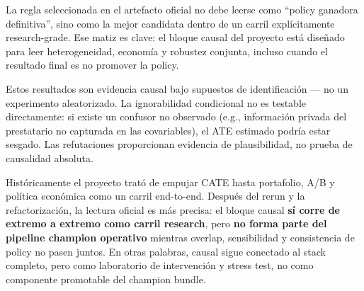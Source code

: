 \documentclass[
  spanish,
  11pt,
  letterpaper,
]{scrbook}
\theoremstyle{plain}
\theoremstyle{remark}
\begin{document}
La regla seleccionada en el artefacto oficial no debe leerse como
``policy ganadora definitiva'', sino como la mejor candidata dentro de
un carril explícitamente research-grade. Ese matiz es clave: el bloque
causal del proyecto está diseñado para leer heterogeneidad, economía y
robustez conjunta, incluso cuando el resultado final es no promover la
policy.

\begin{tcolorbox}[enhanced jigsaw, arc=.35mm, bottomrule=.15mm, bottomtitle=1mm, breakable, colback=white, colbacktitle=quarto-callout-warning-color!10!white, colframe=quarto-callout-warning-color-frame, coltitle=black, left=2mm, leftrule=.75mm, opacityback=0, opacitybacktitle=0.6, rightrule=.15mm, title=\textcolor{quarto-callout-warning-color}{\faExclamationTriangle}\hspace{0.5em}{Limitaciones de la inferencia observacional}, titlerule=0mm, toprule=.15mm, toptitle=1mm]

Estos resultados son evidencia causal bajo supuestos de identificación
--- no un experimento aleatorizado. La ignorabilidad condicional no es
testable directamente: si existe un confusor no observado (e.g.,
información privada del prestatario no capturada en las covariables), el
ATE estimado podría estar sesgado. Las refutaciones proporcionan
evidencia de plausibilidad, no prueba de causalidad absoluta.

\end{tcolorbox}

\begin{tcolorbox}[enhanced jigsaw, arc=.35mm, bottomrule=.15mm, bottomtitle=1mm, breakable, colback=white, colbacktitle=quarto-callout-tip-color!10!white, colframe=quarto-callout-tip-color-frame, coltitle=black, left=2mm, leftrule=.75mm, opacityback=0, opacitybacktitle=0.6, rightrule=.15mm, title=\textcolor{quarto-callout-tip-color}{\faLightbulb}\hspace{0.5em}{Conexión con el pipeline}, titlerule=0mm, toprule=.15mm, toptitle=1mm]

Históricamente el proyecto trató de empujar CATE hasta portafolio, A/B y
política económica como un carril end-to-end. Después del rerun y la
refactorización, la lectura oficial es más precisa: el bloque causal
\textbf{sí corre de extremo a extremo como carril research}, pero
\textbf{no forma parte del pipeline champion operativo} mientras
overlap, sensibilidad y consistencia de policy no pasen juntos. En otras
palabras, causal sigue conectado al stack completo, pero como
laboratorio de intervención y stress test, no como componente promotable
del champion bundle.

\end{tcolorbox}
\end{document}
